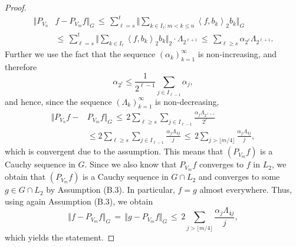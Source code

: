 \documentclass[10pt,a4paper]{amsart}
\newcommand{\ipr}[2]{\left\langle#1,#2\right\rangle}
\begin{document}
\begin{proof}
\begin{align*}
\Vert P_{V_n} &f - P_{V_m} f \Vert_G  \,\le\,
\sum_{\ell=s}^t
\bigg\Vert\sum\limits_{ k\in I_\ell\colon m<k\le n} \ipr{f}{b_k}_2 b_k \bigg\Vert_G
\\ 
&\le\,
\sum_{\ell=s}^t
\bigg\Vert\sum\limits_{ k\in I_\ell} \ipr{f}{b_k}_2 b_k \bigg\Vert_2
  \cdot \Lambda_{2^{\ell+1}}
 \,\leq\, \sum_{\ell \geq s}  \alpha_{2^\ell} \Lambda_{2^{\ell+1}}.
\end{align*}
 Further we use the fact that the sequence $(\alpha_k)_{k=1}^\infty$
 is non-increasing, and therefore
\begin{equation*}%
\alpha_{2^\ell} \leq   \frac{1}{2^{\ell-1}} \sum\limits_{j\in I_{\ell-1}}  {\alpha_j,}
	\end{equation*} 
and hence, since the sequence $(\Lambda_k)_{k=1}^\infty$
is non-decreasing,
\[
\begin{split}
\Vert P_{V_n} f - &P_{V_m} f \Vert_G
 \,\leq\, 2\sum_{\ell \geq s}  \sum\limits_{ j\in I_{\ell-1}}
\frac{\alpha_j \Lambda_{2^{\ell+1}}}{2^{\ell} } 
\\
& \leq 2\sum_{\ell \geq s}  \sum\limits_{ j\in I_{\ell-1}}
\frac{\alpha_j \Lambda_{4j}}{j}   
\,\le\, 2 \sum_{j > \lfloor m/4 \rfloor} \frac{ \alpha_j \Lambda_{4j}}{j},
\end{split}
\]
which is convergent due to the assumption.
This means that $(P_{V_m} f)$ is a Cauchy sequence in $G$.
Since we also know that $P_{V_m} f$ converges to $f$ in $L_2$, 
we obtain that  $(P_{V_m} f)$ is a Cauchy sequence in $G\cap L_2$ and converges to some $g\in G\cap L_2$ by Assumption (B.3). In particular, $f=g$ almost everywhere.
 Thus, using again Assumption (B.3), we obtain 
\[
 \Vert f - P_{V_m} f \Vert_G \,=\,
 \Vert g - P_{V_m} f \Vert_G \,\le\, 
 2 \sum_{j > \lfloor m/4 \rfloor} \frac{ \alpha_j \Lambda_{4j}}{j},
\]
which yields the statement.
 \end{proof}
\end{document}
